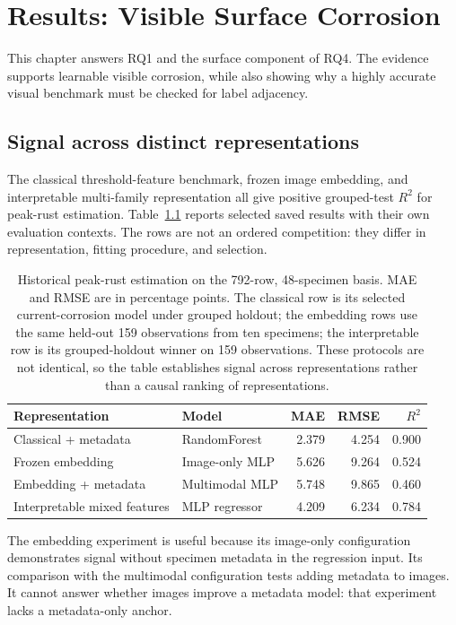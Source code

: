 \chapter{Results: Visible Surface Corrosion}\label{ch:surface}
This chapter answers RQ1 and the surface component of RQ4. The evidence supports learnable visible corrosion, while also showing why a highly accurate visual benchmark must be checked for label adjacency.

\section{Signal across distinct representations}
The classical threshold-feature benchmark, frozen image embedding, and interpretable multi-family representation all give positive grouped-test $R^2$ for peak-rust estimation. Table~\ref{tab:surfacehistory} reports selected saved results with their own evaluation contexts. The rows are not an ordered competition: they differ in representation, fitting procedure, and selection.
\begin{table}[htbp]\centering\small
\caption{Historical peak-rust estimation on the 792-row, 48-specimen basis. MAE and RMSE are in percentage points. The classical row is its selected current-corrosion model under grouped holdout; the embedding rows use the same held-out 159 observations from ten specimens; the interpretable row is its grouped-holdout winner on 159 observations. These protocols are not identical, so the table establishes signal across representations rather than a causal ranking of representations.}\label{tab:surfacehistory}
\begin{tabular}{llrrr}\toprule
Representation & Model & MAE & RMSE & $R^2$\\\midrule
Classical + metadata & RandomForest & 2.379 & 4.254 & 0.900\\
Frozen embedding & Image-only MLP & 5.626 & 9.264 & 0.524\\
Embedding + metadata & Multimodal MLP & 5.748 & 9.865 & 0.460\\
Interpretable mixed features & MLP regressor & 4.209 & 6.234 & 0.784\\\bottomrule
\end{tabular}
\end{table}
The embedding experiment is useful because its image-only configuration demonstrates signal without specimen metadata in the regression input. Its comparison with the multimodal configuration tests adding metadata to images. It cannot answer whether images improve a metadata model: that experiment lacks a metadata-only anchor.

